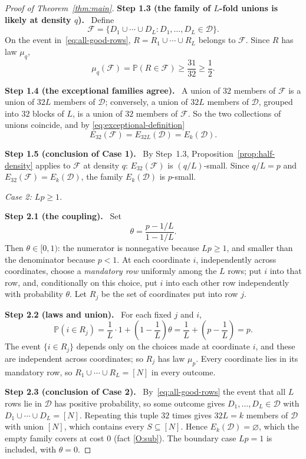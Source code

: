 \documentclass[11pt,letterpaper]{article}
\theoremstyle{definition}
\theoremstyle{remark}
\numberwithin{equation}{section}
\newcommand{\step}[1]{\par\medskip\noindent\textbf{#1}\ }
\begin{document}
\begin{proof}[Proof of Theorem~\ref{thm:main}]
\step{Step 1.3 (the family of $L$-fold unions is likely at density $q$).}
Define
\[
\mathcal F
=\{D_1\cup\cdots\cup D_L:D_1,\ldots,D_L\in\mathcal D\}.
\]
On the event in~\eqref{eq:all-good-rows}, $R=R_1\cup\cdots\cup R_L$
belongs to $\mathcal F$. Since $R$ has law $\mu_q$,
\[
\mu_q(\mathcal F)=\mathbb P(R\in\mathcal F)
\ge\frac{31}{32}\ge\frac12.
\]

\step{Step 1.4 (the exceptional families agree).}
A union of $32$ members of $\mathcal F$ is a union of $32L$ members of
$\mathcal D$; conversely, a union of $32L$ members of $\mathcal D$,
grouped into $32$ blocks of $L$, is a union of $32$ members of
$\mathcal F$. So the two collections of unions coincide, and by
\eqref{eq:exceptional-definition}
\[
E_{32}(\mathcal F)=E_{32L}(\mathcal D)=E_k(\mathcal D).
\]

\step{Step 1.5 (conclusion of Case 1).}
By Step~1.3, Proposition~\ref{prop:half-density} applies to $\mathcal F$
at density $q$: $E_{32}(\mathcal F)$ is $(q/L)$-small. Since $q/L=p$ and
$E_{32}(\mathcal F)=E_k(\mathcal D)$, the family $E_k(\mathcal D)$ is
$p$-small.

\medskip
\noindent\emph{Case 2: $Lp\ge1$.}

\step{Step 2.1 (the coupling).}
Set
\[
\theta=\frac{p-1/L}{1-1/L}.
\]
Then $\theta\in[0,1)$: the numerator is nonnegative because $Lp\ge1$, and
smaller than the denominator because $p<1$. At each coordinate $i$,
independently across coordinates, choose a \emph{mandatory row} uniformly
among the $L$ rows; put $i$ into that row, and, conditionally on this
choice, put $i$ into each other row independently with probability
$\theta$. Let $R_j$ be the set of coordinates put into row $j$.

\step{Step 2.2 (laws and union).}
For each fixed $j$ and $i$,
\[
\mathbb P(i\in R_j)
=\frac1L\cdot1+\left(1-\frac1L\right)\theta
=\frac1L+\left(p-\frac1L\right)=p .
\]
The event $\{i\in R_j\}$ depends only on the choices made at coordinate
$i$, and these are independent across coordinates; so $R_j$ has law
$\mu_p$. Every coordinate lies in its mandatory row, so
$R_1\cup\cdots\cup R_L=[N]$ in every outcome.

\step{Step 2.3 (conclusion of Case 2).}
By~\eqref{eq:all-good-rows} the event that all $L$ rows lie in
$\mathcal D$ has positive probability, so some outcome gives
$D_1,\ldots,D_L\in\mathcal D$ with $D_1\cup\cdots\cup D_L=[N]$. Repeating
this tuple $32$ times gives $32L=k$ members of $\mathcal D$ with union
$[N]$, which contains every $S\subseteq[N]$. Hence
$E_k(\mathcal D)=\varnothing$, which the empty family covers at cost $0$
(fact \ref{O:sub}). The boundary case $Lp=1$ is included, with $\theta=0$.
\end{proof}
\end{document}
